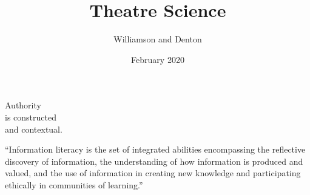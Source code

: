 \documentclass[17pt]{extarticle}
\title{Theatre Science}
\author{Williamson and Denton}
\date{February 2020}
\begin{document}
\maketitle

\newpage


\vspace*{1in}

{\Huge

\begin{center}

  Authority \\
  is constructed \\
  and contextual.

\end{center}

}

\newpage


{\Huge

  \begin{center}

``Information literacy is the set of integrated abilities encompassing the reflective discovery of information, the understanding of how information is produced and valued, and the use of information in creating new knowledge and participating ethically in communities of learning.''

    \end{center}

}

\newpage
\end{document}
